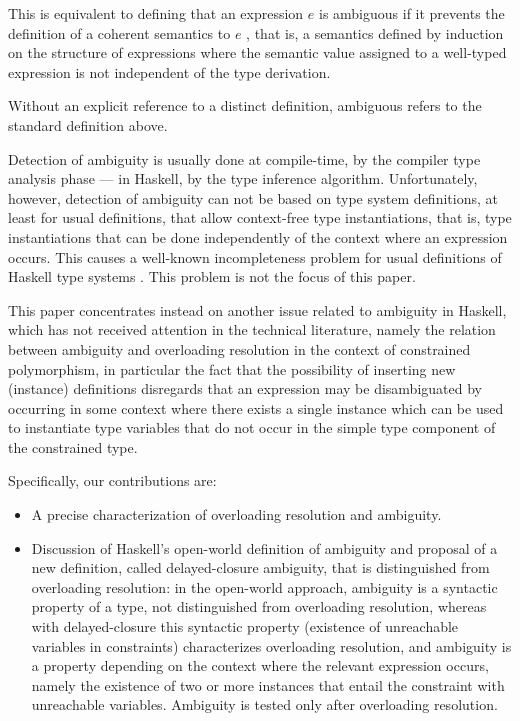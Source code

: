 \documentclass[review]{elsarticle}
\begin{document}
This is equivalent to defining that an expression $e$ is ambiguous if
it prevents the definition of a coherent semantics to $e$ \cite[page
  286]{Mitchell96}, that is, a semantics defined by induction on the
structure of expressions where the semantic value assigned to a
well-typed expression is not independent of the type derivation.

Without an explicit reference to a distinct definition, ambiguous
refers to the standard definition above.

Detection of ambiguity is usually done at compile-time, by the
compiler type analysis phase --- in Haskell, by the type inference
algorithm. Unfortunately, however, detection of ambiguity can not be
based on type system definitions, at least for usual definitions, that
allow context-free type instantiations, that is, type instantiations
that can be done independently of the context where an expression
occurs. This causes a well-known incompleteness problem for usual
definitions of Haskell type systems
\cite{MarkJones94a,Faxen2002,OutsideIn2011}.  This problem is not the
focus of this paper.

This paper concentrates instead on another issue related to ambiguity
in Haskell, which has not received attention in the technical
literature, namely the relation between ambiguity and overloading
resolution in the context of constrained polymorphism, in particular
the fact that the possibility of inserting new (instance) definitions
disregards that an expression may be disambiguated by occurring in
some context where there exists a single instance which can be used to
instantiate type variables that do not occur in the simple type
component of the constrained type.

Specifically, our contributions are:
\begin{itemize}
    \item A precise characterization of overloading resolution and ambiguity.
    \item Discussion of Haskell's open-world definition of ambiguity
      and proposal of a new definition, called delayed-closure
      ambiguity, that is distinguished from overloading resolution: in
      the open-world approach, ambiguity is a syntactic property of a
      type, not distinguished from overloading resolution, whereas
      with delayed-closure this syntactic property (existence of
      unreachable variables in constraints) characterizes overloading
      resolution, and ambiguity is a property depending on the context
      where the relevant expression occurs, namely the existence of
      two or more instances that entail the constraint with
      unreachable variables. Ambiguity is tested only after
      overloading resolution. 
\end{itemize}
\end{document}
